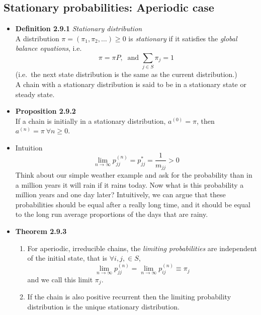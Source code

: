 \documentclass[11pt,a4paper]{article}
\begin{document}
\subsection{Stationary probabilities: Aperiodic case}

\begin{itemize}

    \item \textbf{Definition 2.9.1} \emph{Stationary distribution} \\
        A distribution $\pi = (\pi_1, \pi_2, \ldots) \geq 0$ is \emph{stationary} if it satisfies the \emph{global balance equations}, i.e.
        \[
            \pi = \pi P,\ \text{ and } \sum_{j \in S} \pi_j = 1
        \]
        (i.e.\ the next state distribution is the same as the current distribution.)\\
        A chain with a stationary distribution is said to be in a stationary state
        or steady state.

    \item \textbf{Proposition 2.9.2} \\
        If a chain is initially in a stationary distribution, $a^{(0)} = \pi$,
        then $a^{(n)} = \pi \ \forall n \geq 0$.

    \item Intuition
        \[
            \lim_{n \to \infty} p_{jj}^{(n)} = p_{jj}^* = \frac{1}{m_{jj}} > 0
        \]
        Think about our simple weather example and ask for the probability than in a million
        years it will rain if it rains today.
        Now what is this probability a million years and one day later?
        Intuitively, we can argue that these probabilities should be equal
        after a really long time,
        and it should be equal to the long run average proportions of the days that are rainy.

    \item \textbf{Theorem 2.9.3}
        \begin{enumerate}
            \item For aperiodic, irreducible chains, the \emph{limiting probabilities}
                are independent of the initial state, that is $\forall i, j, \in S$,
                \[
                    \lim_{n \to \infty}p_{jj}^{(n)} =
                    \lim_{n \to \infty} p_{ij}^{(n)} \equiv \pi_j
                \]
                and we call this limit $\pi_j$.
            \item If the chain is also positive recurrent then the limiting probability
                distribution is the unique stationary distribution.
        \end{enumerate}

\end{itemize}
\end{document}
